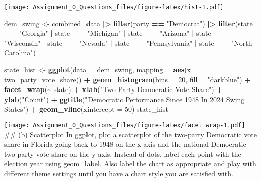 \documentclass[
]{article}
\newenvironment{Shaded}{\begin{snugshade}}{\end{snugshade}}
\newcommand{\AttributeTok}[1]{\textcolor[rgb]{0.13,0.29,0.53}{#1}}
\newcommand{\DecValTok}[1]{\textcolor[rgb]{0.00,0.00,0.81}{#1}}
\newcommand{\FunctionTok}[1]{\textcolor[rgb]{0.13,0.29,0.53}{\textbf{#1}}}
\newcommand{\NormalTok}[1]{#1}
\newcommand{\OtherTok}[1]{\textcolor[rgb]{0.56,0.35,0.01}{#1}}
\newcommand{\SpecialCharTok}[1]{\textcolor[rgb]{0.81,0.36,0.00}{\textbf{#1}}}
\newcommand{\StringTok}[1]{\textcolor[rgb]{0.31,0.60,0.02}{#1}}
\begin{document}
\texttt{[image: Assignment\_0\_Questions\_files/figure-latex/hist-1.pdf]}

\begin{Shaded}
\begin{Highlighting}[]
\NormalTok{dem\_swing }\OtherTok{\textless{}{-}}\NormalTok{ combined\_data }\SpecialCharTok{|\textgreater{}}
  \FunctionTok{filter}\NormalTok{(party }\SpecialCharTok{==} \StringTok{"Democrat"}\NormalTok{) }\SpecialCharTok{|\textgreater{}}
  \FunctionTok{filter}\NormalTok{(state }\SpecialCharTok{==} \StringTok{"Georgia"} \SpecialCharTok{|}\NormalTok{ state }\SpecialCharTok{==} \StringTok{"Michigan"} \SpecialCharTok{|}\NormalTok{ state }\SpecialCharTok{==} \StringTok{"Arizona"} \SpecialCharTok{|}
\NormalTok{           state }\SpecialCharTok{==} \StringTok{"Wisconsin"} \SpecialCharTok{|}\NormalTok{ state }\SpecialCharTok{==} \StringTok{"Nevada"} \SpecialCharTok{|}\NormalTok{ state }\SpecialCharTok{==} \StringTok{"Pennsylvania"} \SpecialCharTok{|}
\NormalTok{           state }\SpecialCharTok{==} \StringTok{"North Carolina"}\NormalTok{)}

\NormalTok{state\_hist }\OtherTok{\textless{}{-}} \FunctionTok{ggplot}\NormalTok{(}\AttributeTok{data =}\NormalTok{ dem\_swing, }
                     \AttributeTok{mapping =} \FunctionTok{aes}\NormalTok{(}\AttributeTok{x =}\NormalTok{ two\_party\_vote\_share)) }\SpecialCharTok{+}
  \FunctionTok{geom\_histogram}\NormalTok{(}\AttributeTok{bins =} \DecValTok{20}\NormalTok{, }\AttributeTok{fill =} \StringTok{"darkblue"}\NormalTok{) }\SpecialCharTok{+}
  \FunctionTok{facet\_wrap}\NormalTok{(}\SpecialCharTok{\textasciitilde{}}\NormalTok{ state) }\SpecialCharTok{+}
  \FunctionTok{xlab}\NormalTok{(}\StringTok{"Two{-}Party Democratic Vote Share"}\NormalTok{) }\SpecialCharTok{+}
  \FunctionTok{ylab}\NormalTok{(}\StringTok{"Count"}\NormalTok{) }\SpecialCharTok{+}
  \FunctionTok{ggtitle}\NormalTok{(}\StringTok{"Democratic Performance Since 1948 In 2024 Swing States"}\NormalTok{) }\SpecialCharTok{+}
  \FunctionTok{geom\_vline}\NormalTok{(}\AttributeTok{xintercept =} \DecValTok{50}\NormalTok{)}
\NormalTok{state\_hist}
\end{Highlighting}
\end{Shaded}

\texttt{[image: Assignment\_0\_Questions\_files/figure-latex/facet wrap-1.pdf]}
\#\# (b) Scatterplot In ggplot, plot a scatterplot of the two-party
Democratic vote share in Florida going back to 1948 on the x-axis and
the national Democratic two-party vote share on the y-axis. Instead of
dots, label each point with the election year using geom\_label. Also
label the chart as appropriate and play with different theme settings
until you have a chart style you are satisfied with.
\end{document}

